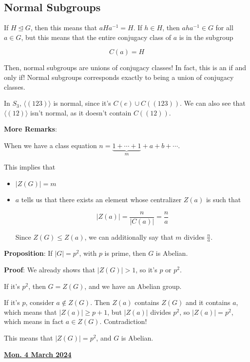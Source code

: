 \documentclass[12pt]{article}
\renewcommand{\date}[1]{\underline{\bf #1}}
\newcommand{\lr}[1]{\langle #1 \rangle}
\begin{document}
\subsection{Normal Subgroups}

If $H \trianglelefteq G$, then this means that $aHa^{-1} = H$. If $h \in H$,
then $aha^{-1} \in G$ for all $a \in G$, but this means that the entire
conjugacy class of $a$ is in the subgroup

\[
  C(a) = H
\]

Then, normal subgroups are unions of conjugacy classes! In fact, this is an if
and only if! Normal subgroups corresponds exactly to being a union of conjugacy
classes.

In $S_3$, $\lr {(123)}$ is normal, since it's $C(e) \cup C((123))$. We can also
see that $\lr {(12)}$ isn't normal, as it doesn't contain $C((12))$.

{\bf More Remarks}:

When we have a class equation $n = \underbrace{1 + \cdots + 1}_{m} + a + b +
\cdots$.

This implies that

\begin{itemize}
  \item $|Z(G)| = m$
  \item $a$ tells us that there exists an element whose centralizer $Z(a)$ is
    such that

    \[
      |Z(a)| = \frac{n}{|C(a)|} = \frac{n}{a}
    \]

    Since $Z(G) \le Z(a)$, we can additionally say that $m$ divides $\frac{n}{a}$.
\end{itemize}

{\bf Proposition}: If $|G| = p^2$, with $p$ is prime, then $G$ is Abelian.

{\bf Proof}: We already shows that $|Z(G)| > 1$, so it's $p$ or $p^2$.

If it's $p^2$, then $G = Z(G)$, and we have an Abelian group.

If it's $p$, consider $a \not\in Z(G)$. Then $Z(a)$ contains $Z(G)$ and it
contains $a$, which means that $|Z(a)| \ge p + 1$, but $|Z(a)|$ divides $p^2$,
so $|Z(a)| = p^2$, which means in fact $a \in Z(G)$. Contradiction!

This means that $|Z(G)| = p^2$, and $G$ is Abelian.


\date {Mon. 4 March 2024}
\end{document}
